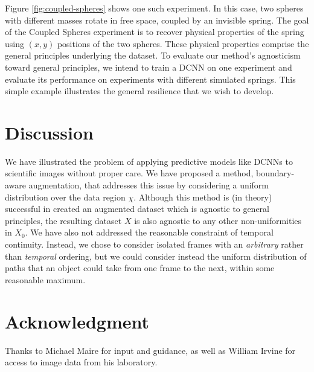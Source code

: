 \documentclass[10pt, draftcls]{IEEEtran}
\begin{document}
Figure \ref{fig:coupled-spheres} shows one such experiment. In this case, two
spheres with different masses rotate in free space, coupled by an invisible
spring. The goal of the Coupled Spheres experiment is to recover physical
properties of the spring using $(x,y)$ positions of the two spheres. These
physical properties comprise the general principles underlying the dataset. To
evaluate our method's agnosticism toward general principles, we intend to train
a DCNN on one experiment and evaluate its performance on experiments with
different simulated springs. This simple example illustrates the general
resilience that we wish to develop.

\section{Discussion}
\label{sec:discussion}

We have illustrated the problem of applying predictive models like DCNNs to
scientific images without proper care. We have proposed a method, boundary-aware
augmentation, that addresses this issue by considering a uniform distribution
over the data region $\chi$. Although this method is (in theory) successful in
created an augmented dataset which is agnostic to general principles, the
resulting dataset $X$ is also agnostic to any other non-uniformities in
$X_0$. We have also not addressed the reasonable constraint of temporal
continuity. Instead, we chose to consider isolated frames with an
\emph{arbitrary} rather than \emph{temporal} ordering, but we could consider
instead the uniform distribution of paths that an object could take from one
frame to the next, within some reasonable maximum.




\section*{Acknowledgment}
\label{sec:acknowledgment}

Thanks to Michael Maire for input and guidance, as well as William Irvine for
access to image data from his laboratory.



\end{document}

